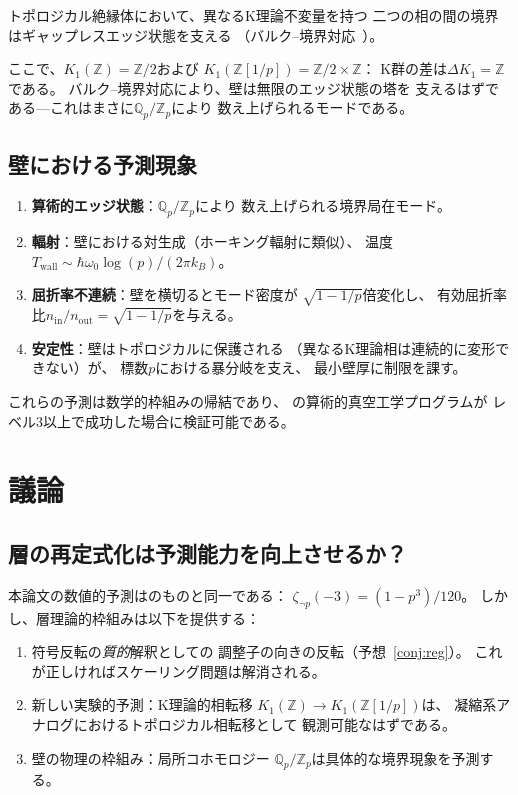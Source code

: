 \documentclass[11pt,a4paper]{article}
\newcommand{\Zp}{\mathbb{Z}[1/p]}
\newcommand{\Qp}{\mathbb{Q}_p}
\begin{document}
トポロジカル絶縁体において、異なるK理論不変量を持つ
二つの相の間の境界はギャップレスエッジ状態を支える
（バルク--境界対応~\cite{Kitaev2009}）。

ここで、$K_1(\mathbb{Z}) = \mathbb{Z}/2$および
$K_1(\Zp) = \mathbb{Z}/2 \times \mathbb{Z}$：
K群の差は$\Delta K_1 = \mathbb{Z}$である。
バルク--境界対応により、壁は無限のエッジ状態の塔を
支えるはずである---これはまさに$\Qp/\mathbb{Z}_p$により
数え上げられるモードである。

\subsection{壁における予測現象}

\begin{enumerate}
  \item \textbf{算術的エッジ状態}：$\Qp/\mathbb{Z}_p$により
    数え上げられる境界局在モード。
  \item \textbf{輻射}：壁における対生成（ホーキング輻射に類似）、
    温度$T_{\mathrm{wall}} \sim \hbar\omega_0 \log(p) / (2\pi k_B)$。
  \item \textbf{屈折率不連続}：壁を横切るとモード密度が
    $\sqrt{1-1/p}$倍変化し、
    有効屈折率比$n_{\mathrm{in}}/n_{\mathrm{out}} = \sqrt{1-1/p}$を与える。
  \item \textbf{安定性}：壁はトポロジカルに保護される
    （異なるK理論相は連続的に変形できない）が、
    標数$p$における暴分岐を支え、
    最小壁厚に制限を課す。
\end{enumerate}

これらの予測は数学的枠組みの帰結であり、
\cite{paper_A}の算術的真空工学プログラムが
レベル3以上で成功した場合に検証可能である。

\section{議論}
\label{sec:discussion}

\subsection{層の再定式化は予測能力を向上させるか？}

本論文の数値的予測は\cite{paper_A}のものと同一である：
$\zeta_{\neg p}(-3) = (1-p^3)/120$。
しかし、層理論的枠組みは以下を提供する：
\begin{enumerate}
  \item 符号反転の\emph{質的}解釈としての
    調整子の向きの反転（予想~\ref{conj:reg}）。
    これが正しければスケーリング問題は解消される。
  \item 新しい実験的予測：K理論的相転移
    $K_1(\mathbb{Z}) \to K_1(\Zp)$は、
    凝縮系アナログにおけるトポロジカル相転移として
    観測可能なはずである。
  \item 壁の物理の枠組み：局所コホモロジー
    $\Qp/\mathbb{Z}_p$は具体的な境界現象を予測する。
\end{enumerate}
\end{document}
